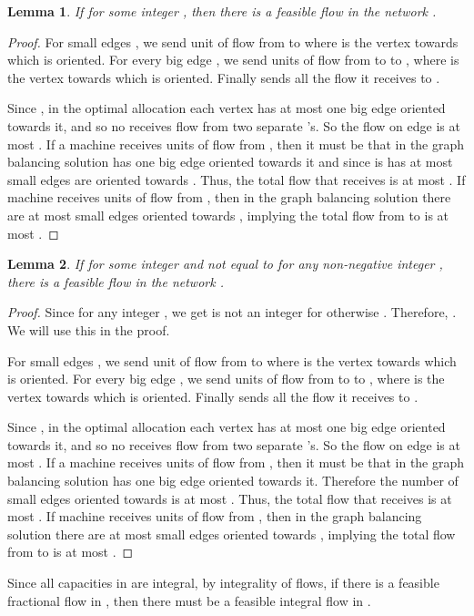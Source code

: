 \documentclass[11pt]{article}
\newtheorem{lemma}{Lemma}
\begin{document}
\begin{lemma}\label{lem:21}
If  for some integer , then there is a feasible flow in the network . \end{lemma}
\begin{proof}
	For small edges , we send  unit of flow from  to  where  is the vertex towards which  is oriented. 
	For every big edge , we send  units of flow from  to  to , where  is the vertex towards which  is oriented. 
	Finally  sends all the flow it receives to .
	
	
	Since , in the optimal allocation each vertex has at most one big edge oriented towards it, and so no  receives flow from two separate 's. So the flow on  edge is at most . If a machine  receives  units of flow from , then it must be that in the graph balancing solution  has one big edge oriented towards it and since  is has at most  small edges are oriented towards . Thus, the total flow that  receives is at most . If machine  receives  units of flow from , then in the graph balancing solution there are at most  small edges oriented towards , implying the total flow from  to  is at most .
\end{proof}

\begin{lemma}\label{lem:22}
If  for some integer  and not equal to  for any non-negative integer , there is a feasible flow in the network . \end{lemma}
\begin{proof}
	Since  for any integer , we get  is not an integer for otherwise . Therefore, .
	We will use this in the proof.
	
	For small edges , we send  unit of flow from  to  where  is the vertex towards which  is oriented. 
	For every big edge , we send  units of flow from  to  to , where  is the vertex towards which  is oriented. 
	Finally  sends all the flow it receives to .
	
	Since , in the optimal allocation each vertex has at most one big edge oriented towards it, and so no  receives flow from two separate 's. So the flow on  edge is at most . If a machine  receives  units of flow from , then it must be that in the graph balancing solution  has one big edge oriented towards it.
	Therefore the number of small edges oriented towards  is at most  .
		 Thus, the total flow that  receives is at most . If machine  receives  units of flow from , then in the graph balancing solution there are at most  small edges oriented towards , implying the total flow from  to  is at most .
\end{proof}
\noindent
Since all capacities in  are integral, by integrality of flows,  if there is a feasible fractional flow in , then there must be a feasible integral flow in .
\end{document}
